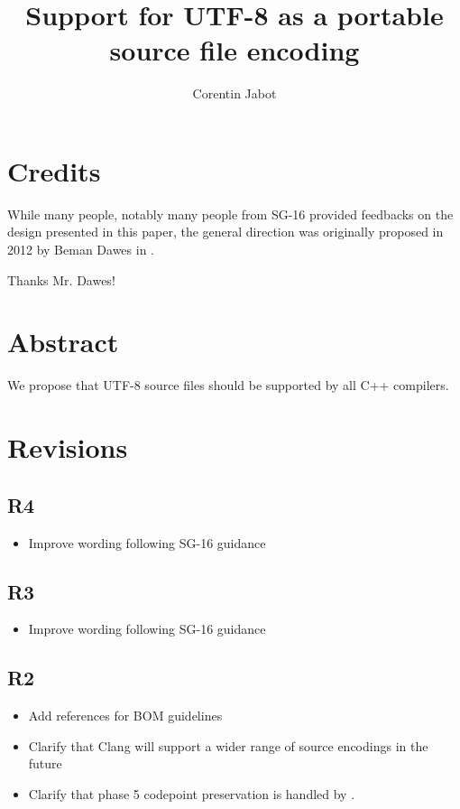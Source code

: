 \documentclass{wg21}
\title{Support for UTF-8 as a portable source file encoding}
\author{Corentin Jabot}{corentin.jabot@gmail.com}
\begin{document}
    
\maketitle


\section{Credits}

While many people, notably many people from SG-16 provided feedbacks on the design presented in this paper,
the general direction was originally proposed in 2012 by Beman Dawes in .

Thanks Mr. Dawes!

\section{Abstract}

We propose that UTF-8 source files should be supported by all C++ compilers.

\section{Revisions}

\subsection{R4}
\begin{itemize}
    \item Improve wording following SG-16 guidance
\end{itemize}

\subsection{R3}
\begin{itemize}
\item Improve wording following SG-16 guidance
\end{itemize}

\subsection{R2}
\begin{itemize}
    \item Add references for BOM guidelines
    \item Clarify that Clang will support a wider range of source encodings in the future
    \item Clarify that phase 5 codepoint preservation is handled by .
\end{itemize}
\end{document}
